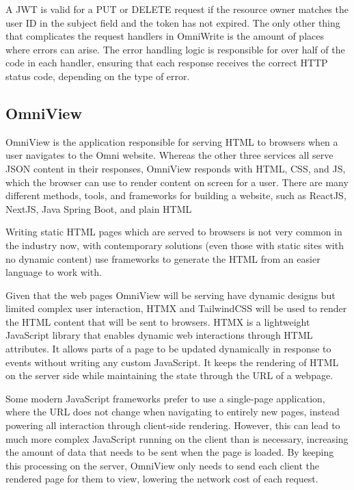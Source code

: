 A JWT is valid for a PUT or DELETE request if the resource owner matches the user ID in the subject field and the token has not expired.
The only other thing that complicates the request handlers in OmniWrite is the amount of places where errors can arise. 
The error handling logic is responsible for over half of the code in each handler, ensuring that each response receives the correct HTTP status code, depending on the type of error.

\subsection{OmniView}
OmniView is the application responsible for serving HTML to browsers when a user navigates to the Omni website.
Whereas the other three services all serve JSON content in their responses, OmniView responds with HTML, CSS, and JS, which the browser can use to render content on screen for a user.
There are many different methods, tools, and frameworks for building a website, such as ReactJS, NextJS, Java Spring Boot, and plain HTML \citep{StackOverflow2024}

Writing static HTML pages which are served to browsers is not very common in the industry now, with contemporary solutions (even those with static sites with no dynamic content) use frameworks to generate the HTML from an easier language to work with. 

Given that the web pages OmniView will be serving have dynamic designs but limited complex user interaction, HTMX and TailwindCSS will be used to render the HTML content that will be sent to browsers.
HTMX is a lightweight JavaScript library that enables dynamic web interactions through HTML attributes.
It allows parts of a page to be updated dynamically in response to events without writing any custom JavaScript. It keeps the rendering of HTML on the server side while maintaining the state through the URL of a webpage. 

Some modern JavaScript frameworks prefer to use a single-page application, where the URL does not change when navigating to entirely new pages, instead powering all interaction through client-side rendering.
However, this can lead to much more complex JavaScript running on the client than is necessary, increasing the amount of data that needs to be sent when the page is loaded.
By keeping this processing on the server, OmniView only needs to send each client the rendered page for them to view, lowering the network cost of each request. 

